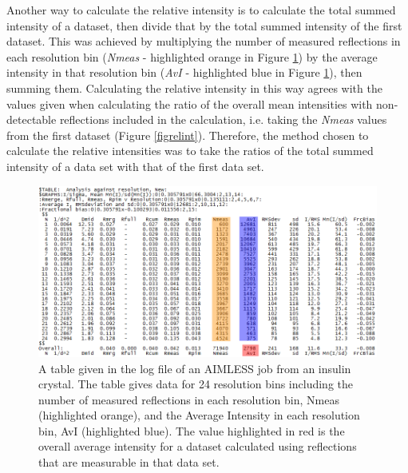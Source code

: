 Another way to calculate the relative intensity is to calculate the total summed intensity of a dataset, then divide that by the total summed intensity of the first dataset.
This was achieved by multiplying the number of measured reflections in each resolution bin (\textit{Nmeas} - highlighted orange in Figure \ref{fig: AIMLESS log file}) by the average intensity in that resolution bin (\textit{AvI} - highlighted blue in Figure \ref{fig: AIMLESS log file}), then summing them.
Calculating the relative intensity in this way agrees with the values given when calculating the ratio of the overall mean intensities with non-detectable reflections included in the calculation, i.e. taking the \textit{Nmeas} values from the first dataset (Figure \ref{figrelint}).
Therefore, the method chosen to calculate the relative intensities was to take the ratios of the total summed intensity of a data set with that of the first data set.
\begin{figure}
  \centering
    \includegraphics[width=1\textwidth]{figures/dwd/aimlesslog.png}
    \caption[Resolution analysis table from the log file of an AIMLESS job.]{A table given in the log file of an AIMLESS job from an insulin crystal.
    The table gives data for 24 resolution bins including the number of measured reflections in each resolution bin, Nmeas (highlighted orange), and the Average Intensity in each resolution bin, AvI (highlighted blue).
    The value highlighted in red is the overall average intensity for a dataset calculated using reflections that are measurable in that data set.}
    \label{fig: AIMLESS log file}
\end{figure}

